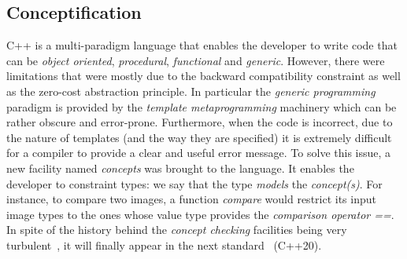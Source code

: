 \subsection{Conceptification}
\label{subsec:conceptification}

C++ is a multi-paradigm language that enables the developer to write code that can be \emph{object oriented},
\emph{procedural}, \emph{functional} and \emph{generic}. However, there were limitations that were mostly due to the
backward compatibility constraint as well as the zero-cost abstraction principle. In particular the \emph{generic
  programming} paradigm is provided by the \emph{template metaprogramming} machinery which can be rather obscure and
error-prone. Furthermore, when the code is incorrect, due to the nature of templates (and the way they are specified) it
is extremely difficult for a compiler to provide a clear and useful error message. To solve this issue, a new facility
named \emph{concepts} was brought to the language. It enables the developer to constraint types: we say that the type
\emph{models} the \emph{concept(s)}. For instance, to compare two images, a function \emph{compare} would restrict its
input image types to the ones whose value type provides the \emph{comparison operator ==}. In spite of the history
behind the \emph{concept checking} facilities being very
turbulent~\parencite{seymour.2009.concepts,stroustrup.2003.concepts,sutton.2017.concepts}, it will finally appear in the
next standard~\cite{voutilainen.2017.concepts} (C++20).

